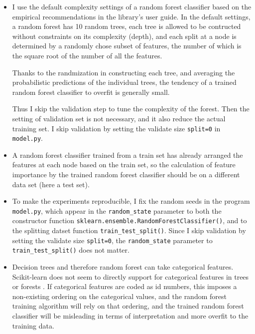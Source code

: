 \documentclass[final, 12pt]{elsarticle}
\begin{document}
\begin{itemize}
  
\item I use the default complexity settings of a random forest classifier based on the empirical recommendations in the library's user guide.
In the default settings,
a random forest has 10 random trees, 
each tree is allowed to be contructed without constraints on its complexity (depth), and
each split at a node is determined by a randomly chose subset of features, the number of which is the square root of the number of all the features.

Thanks to the randmization in constructing each tree, and averaging the probabilistic predictions of the individual trees, 
the tendency of a trained random forest classifier to overfit is generally small. %

Thus I skip the validation step to tune the complexity of the forest.
Then the setting of validation set is not necessary, and it also reduce the actual training set. 
I skip validation by setting the validate size \verb|split=0| in \verb|model.py|.

\item A random forest classifier trained from a train set has already arranged the features at each node based on the train set, so the calculation of feature importance by the trained random forest classifier should be on a different data set (here a test set).

\item To make the experiments reproducible, I fix the random seeds in the program \verb|model.py|, which appear in
the \verb|random_state| parameter to both the constructor function \verb|sklearn.ensemble.RandomForestClassifier()|, and to the splitting datset function \verb|train_test_split()|.
Since I skip validation by setting the validate size \verb|split=0|,  the \verb|random_state| parameter to  \verb|train_test_split()| does not matter.

\item Decision trees and therefore random forest can take categorical features. %
Scikit-learn does not seem to directly support for categorical features in trees or forests \cite{web:slcat}. %
If categorical features are coded as id numbers, this imposes a non-existing ordering on the categorical values, and the random forest training algorithm will rely on that ordering,  and the trained random forest classifier will be misleading in terms of interpretation and more overfit to the training data.


\end{itemize}
\end{document}
